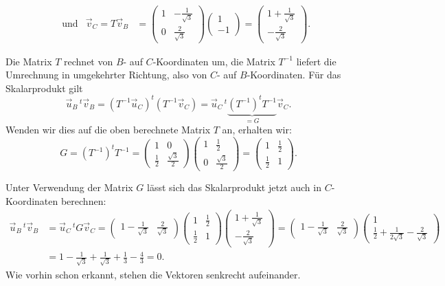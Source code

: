 \begin{loesung}
\begin{teilaufgaben}
\[\begin{aligned}
&
&\text{und}&
\vec v_C
=
T\vec v_B
&=
\begin{pmatrix}1&-\frac1{\sqrt{3}}\\0&\frac2{\sqrt{3}}\end{pmatrix}
\begin{pmatrix}1\\-1\end{pmatrix}
=
\begin{pmatrix} 1+\frac1{\sqrt{3}}\\-\frac2{\sqrt{3}} \end{pmatrix}.
\end{aligned}
\]
\item
Die Matrix $T$ rechnet von $B$- auf $C$-Koordinaten um, die Matrix $T^{-1}$
liefert die Umrechnung in umgekehrter Richtung, also von $C$- auf $B$-Koordinaten.
Für das Skalarprodukt gilt
\[
\vec u_B\,\!\!^t \vec v_B
=
(T^{-1}\vec u_C)^t(T^{-1}\vec v_C)
=
\vec u_C\,\!\!^t
\underbrace{ (T^{-1})^t T^{-1}}_{\displaystyle =G} \vec v_C.
\]
Wenden wir dies auf die oben berechnete Matrix $T$ an, erhalten wir:
\[
G
=
(T^{-1})^tT^{-1}
=
\begin{pmatrix}1&0\\\frac12&\frac{\sqrt{3}}2\end{pmatrix}
\begin{pmatrix}1&\frac12\\0&\frac{\sqrt{3}}2\end{pmatrix}
=
\begin{pmatrix} 1&\frac12\\\frac12&1 \end{pmatrix}.
\]
\item
Unter Verwendung der Matrix $G$ lässt sich das Skalarprodukt jetzt auch
in $C$-Koordinaten berechnen:
\begin{align*}
\vec u_B\,\!\!^t \vec v_B
&=
\vec u_C\,\!\!^t G \vec v_C
=
\begin{pmatrix} 1-\frac1{\sqrt{3}}&\frac2{\sqrt{3}} \end{pmatrix}
\begin{pmatrix} 1&\frac12\\\frac12&1 \end{pmatrix}
\begin{pmatrix} 1+\frac1{\sqrt{3}}\\-\frac2{\sqrt{3}} \end{pmatrix}
=
\begin{pmatrix} 1-\frac1{\sqrt{3}}&\frac2{\sqrt{3}} \end{pmatrix}
\begin{pmatrix} 1\\
\frac12+\frac1{2\sqrt{3}}-\frac2{\sqrt{3}}
\end{pmatrix}
\\
&=
1-\frac1{\sqrt{3}}
+
\frac1{\sqrt{3}}+\frac13-\frac43
=
0.
\end{align*}
Wie vorhin schon erkannt, stehen die Vektoren senkrecht aufeinander.
\qedhere
\end{teilaufgaben}
\end{loesung}

